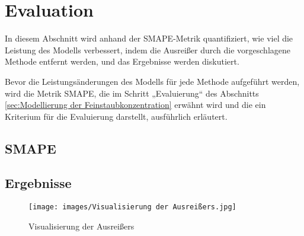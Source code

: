 \chapterpage\chapter{Evaluation}
        In diesem Abschnitt wird anhand der SMAPE-Metrik quantifiziert, wie viel die Leistung des Modells verbessert, indem die Ausreißer durch die vorgeschlagene Methode entfernt werden, und das Ergebnisse werden diskutiert.
        
        Bevor die Leistungsänderungen des Modells für jede Methode aufgeführt werden, wird die Metrik SMAPE, die im Schritt „Evaluierung“ des Abschnitts \ref{sec:Modellierung der Feinstaubkonzentration} erwähnt wird und die ein Kriterium für die Evaluierung darstellt, ausführlich erläutert.
        
        \section*{SMAPE}
        
        \section*{Ergebnisse}

            

            


            \begin{figure}[h]
                \centering
                \texttt{[image: images/Visualisierung der Ausreißers.jpg]}
                \caption{Visualisierung der Ausreißers}
                \label{fig:Visualisierung der Ausreißers}
            \end{figure}